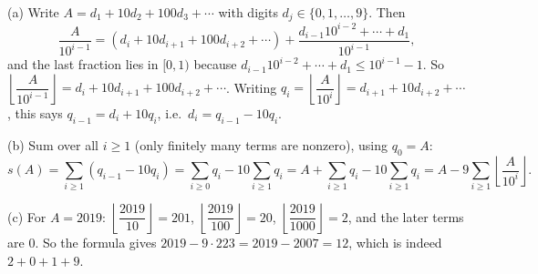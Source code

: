 (a) Write $A=d_1+10d_2+100d_3+\cdots$ with digits $d_j\in\{0,1,\dots,9\}$. Then
\[
\dfrac{A}{10^{i-1}}=\left(d_i+10d_{i+1}+100d_{i+2}+\cdots\right)+\dfrac{d_{i-1}10^{i-2}+\cdots+d_1}{10^{i-1}},
\]
and the last fraction lies in $[0,1)$ because $d_{i-1}10^{i-2}+\cdots+d_1\le10^{i-1}-1$. So $\left\lfloor\dfrac {A}{10^{i-1}}\right\rfloor=d_i+10d_{i+1}+100d_{i+2}+\cdots$. Writing $q_i=\left\lfloor\dfrac{A}{10^{i}}\right\rfloor=d_{i+1}+10d_{i+2}+\cdots$, this says $q_{i-1}=d_i+10q_i$, i.e.\ $d_i=q_{i-1}-10q_i$.

(b) Sum over all $i\ge1$ (only finitely many terms are nonzero), using $q_0=A$:
\[
s(A)=\sum_{i\ge1}\left(q_{i-1}-10q_i\right)=\sum_{i\ge0}q_i-10\sum_{i\ge1}q_i=A+\sum_{i\ge1}q_i-10\sum_{i\ge1}q_i=A-9\sum_{i\ge1}\left\lfloor\dfrac{A}{10^{i}}\right\rfloor .
\]

(c) For $A=2019$: $\left\lfloor\dfrac{2019}{10}\right\rfloor=201$, $\left\lfloor\dfrac{2019}{100}\right\rfloor=20$, $\left\lfloor\dfrac{2019}{1000}\right\rfloor=2$, and the later terms are $0$. So the formula gives $2019-9\cdot223=2019-2007=\boxed{12}$, which is indeed $2+0+1+9$.
